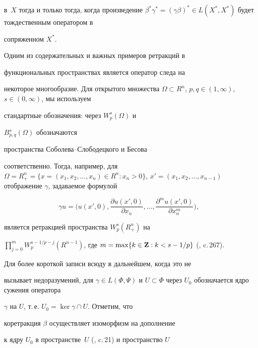 в~$X$ тогда и только тогда, когда произведение $\beta^*\gamma^* =


(\gamma\beta)^* \in L(X^*,X^*)$ будет тождественным оператором в


сопряженном $X^*$.





Одним из содержательных и важных примеров ретракций в


функциональных пространствах является оператор следа на


некоторое многообразие. Для открытого множества $\Omega \subset


R^n$, $p, q \in (1, \infty)$, $s \in (0,\infty)$, мы используем


стандартные обозначения: через $W^s_p(\Omega)$ и


$B^s_{p, q}(\Omega)$ обозначаются


пространства Соболева--Слободецкого и Бесова


соответственно. Тогда, например, для $\Omega= R^n_+=\{x =


(x_1, x_2, \dotsc, x_n) \in R^n : x_n > 0 \}$, $x'=(x_1, x_2,


\dotsc, x_{n-1})$ отображение $\gamma$, задаваемое формулой


$$


\gamma u=\bigg(u(x',0), \frac{\partial u(x',0)}{\partial x_n}, \dotsc,


\frac{\partial ^m u(x',0)}{\partial x_n^m}\bigg),


$$


является ретракцией пространства $W^s_p (R^n_+)$ на


$\prod \limits_{j=0}^m W_p^{s-1/p-j}(R^{n-1})$, где $m=\max \{k


\in \bold Z : k < s-1/p \}$ (\cite{Trib}, c.\,267).





Для более короткой записи всюду в дальнейшем, когда это не


вызывает недоразумений, для $\gamma \in L(\Phi, \Psi)$ и $U


\subset \Phi$ через $U_0$ обозначается ядро сужения оператора


$\gamma$ на $U$, т.\,е. $U_0 =\ker \gamma \cap U$. Отметим, что


коретракция $\beta$ осуществляет изоморфизм на дополнение


к ядру $U_0$ в пространстве~$U$ (\cite{Trib}, c.\,21) и пространство $U$


